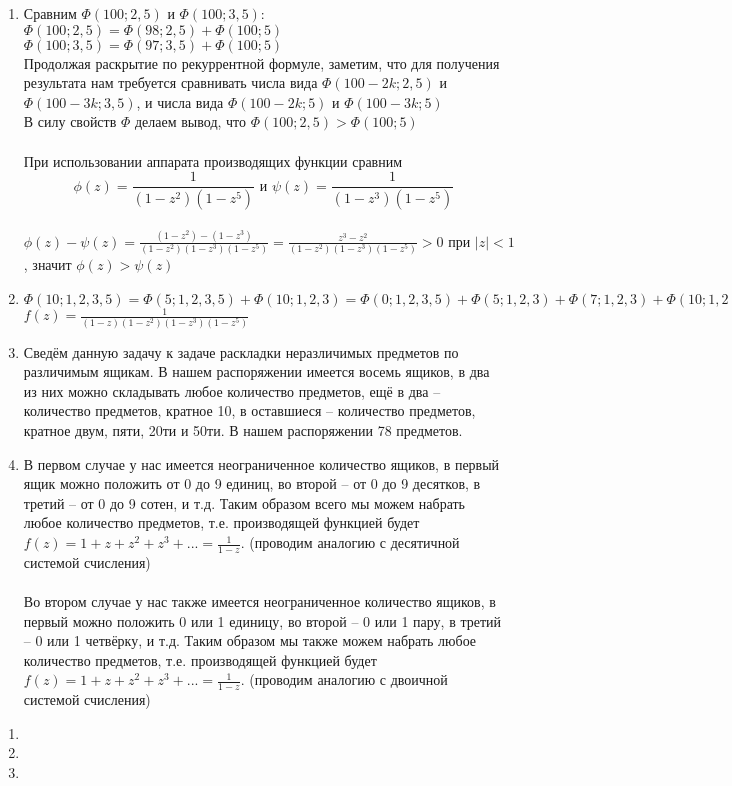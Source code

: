 
\begin{enumerate}
  \item
    Сравним $\Phi(100;2,5)$ и $\Phi(100;3,5)$:\\
    $\Phi(100;2,5) = \Phi(98;2,5) + \Phi(100; 5)$\\
    $\Phi(100;3,5) = \Phi(97;3,5) + \Phi(100; 5)$\\
    Продолжая раскрытие по рекуррентной формуле, заметим, что для получения результата нам требуется сравнивать числа вида $\Phi(100-2k;2,5)$ и $\Phi(100-3k;3,5)$, и числа вида $\Phi(100-2k;5)$ и $\Phi(100-3k;5)$\\
    В силу свойств $\Phi$ делаем вывод, что $\Phi(100;2,5) > \Phi(100;5)$\\ \\
    При использовании аппарата производящих функции сравним $$\phi(z)=\frac{1}{(1-z^2)(1-z^5)} \text{ и } \psi(z)=\frac{1}{(1-z^3)(1-z^5)}$$\\
    $\phi(z) - \psi(z) = \frac{(1-z^2) - (1-z^3)}{(1-z^2)(1-z^3)(1-z^5)} = \frac{z^3-z^2}{(1-z^2)(1-z^3)(1-z^5)} > 0 \text{ при } |z| < 1$,
    значит $\phi(z) > \psi(z)$
    
  \item
    $\Phi(10; 1,2,3,5) = \Phi(5; 1,2,3,5) + \Phi(10; 1,2,3) = \Phi(0; 1,2,3,5) + \Phi(5; 1,2,3) + \Phi(7; 1,2,3) + \Phi(10; 1,2) = 1 + \Phi(2; 1,2,3) + \Phi(5; 1,2) + \Phi(4; 1,2,3) + \Phi(7; 1,2) + \Phi(8; 1,2) + \Phi(10; 1) = 2 + \Phi(2; 1,2) + \Phi(3; 1,2) + \Phi(5; 1) + \Phi(1; 1,2,3) + \Phi(4; 1,2) + \Phi(5; 1,2) + \Phi(7; 1) + \Phi(6; 1,2) + \Phi(8; 1) = 20$\\
    $f(z) = \frac{1}{(1-z)(1-z^2)(1-z^3)(1-z^5)}$
  
  \item
    Сведём данную задачу к задаче раскладки неразличимых предметов по различимым ящикам. В нашем распоряжении имеется восемь ящиков, в два из них можно складывать любое количество предметов, ещё в два -- количество предметов, кратное 10, в оставшиеся -- количество предметов, кратное двум, пяти, 20ти и 50ти. В нашем распоряжении 78 предметов.\\
  
  \item
    В первом случае у нас имеется неограниченное количество ящиков, в первый ящик можно положить от 0 до 9 единиц, во второй -- от 0 до 9 десятков, в третий -- от 0 до 9 сотен, и т.д. Таким образом всего мы можем набрать любое количество предметов, т.е. производящей функцией будет $f(z) = 1 + z + z^2 + z^3 + ... = \frac{1}{1-z}$. (проводим аналогию с десятичной системой счисления)\\ \\
    Во втором случае у нас также имеется неограниченное количество ящиков, в первый можно положить 0 или 1 единицу, во второй -- 0 или 1 пару, в третий -- 0 или 1 четвёрку, и т.д. Таким образом мы также можем набрать любое количество предметов, т.е. производящей функцией будет $f(z) = 1 + z + z^2 + z^3 + ... = \frac{1}{1-z}$. (проводим аналогию с двоичной системой счисления)
\end{enumerate}

\begin{enumerate}
  \item
  \item
  \item
\end{enumerate}